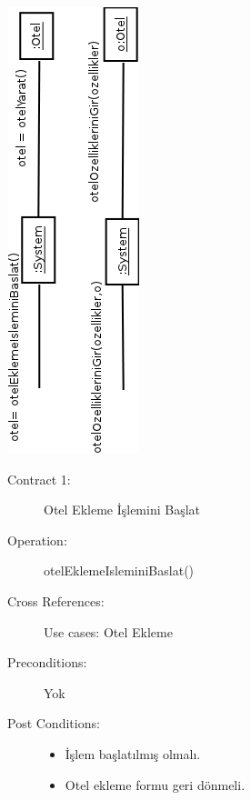 \documentclass[12pt,a4paper]{report}
\begin{document}
\begin{center}
\includegraphics{dia/eventdiagram-usecase4.png}
\end{center}

\newpage

\begin{description}
\item[Contract 1:] Otel Ekleme İşlemini Başlat
\item[Operation:] otelEklemeIsleminiBaslat()
\item[Cross References:] Use cases: Otel Ekleme
\item[Preconditions:] Yok
\item[Post Conditions:] \hspace{10 mm}
\begin{itemize} 
\item İşlem başlatılmış olmalı.
\item Otel ekleme formu geri dönmeli. \\
\end{itemize}
\end{description}
\end{document}
